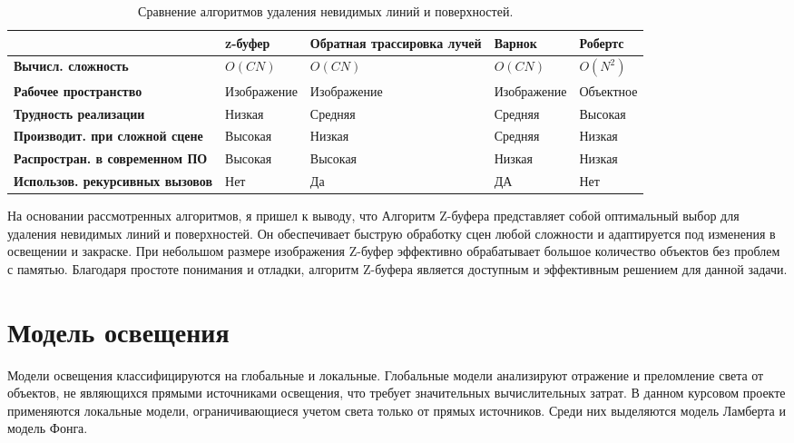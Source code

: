 \begin{table}[h!]
	\centering
	\caption{\raggedleft Сравнение алгоритмов удаления невидимых линий и поверхностей.}\label{table:1}
	\begin{tabularx}{\textwidth}{|X|X|X|X|X|}
		\hline
		& \textbf{z-буфер} & \textbf{Обратная трассировка лучей} & \textbf{Варнок} & \textbf{Робертс} \\
		\hline
		\textbf{Вычисл. сложность} & $O(CN)$ & $O(CN)$ & $O(CN)$ & $O(N^2)$ \\
		\hline
		\textbf{Рабочее пространство} & Изображение & Изображение & Изображение & Объектное \\
		\hline
		\textbf{Трудность \newline реализации} & Низкая & Средняя & Средняя & Высокая \\
		\hline
		\textbf{Производит. при сложной сцене} & Высокая & Низкая & Средняя & Низкая \\
		\hline
		\textbf{Распростран. в современном ПО} & Высокая & Высокая & Низкая & Низкая \\
		\hline
		\textbf{Использов. рекурсивных вызовов} & Нет & Да & ДА & Нет \\
		\hline
	\end{tabularx}
\end{table}





На основании рассмотренных алгоритмов, я пришел к выводу, что  Алгоритм Z-буфера представляет собой оптимальный выбор для удаления невидимых линий и поверхностей. Он обеспечивает быструю обработку сцен любой сложности и адаптируется под изменения в освещении и закраске. При небольшом размере изображения Z-буфер эффективно обрабатывает большое количество объектов без проблем с памятью. Благодаря простоте понимания и отладки, алгоритм Z-буфера является доступным и эффективным решением для данной задачи.


\section{Модель освещения}

Модели освещения классифицируются на глобальные и локальные. Глобальные модели анализируют отражение и преломление света от объектов, не являющихся прямыми источниками освещения, что требует значительных вычислительных затрат. В данном курсовом проекте применяются локальные модели, ограничивающиеся учетом света только от прямых источников. Среди них выделяются модель Ламберта и модель Фонга.





